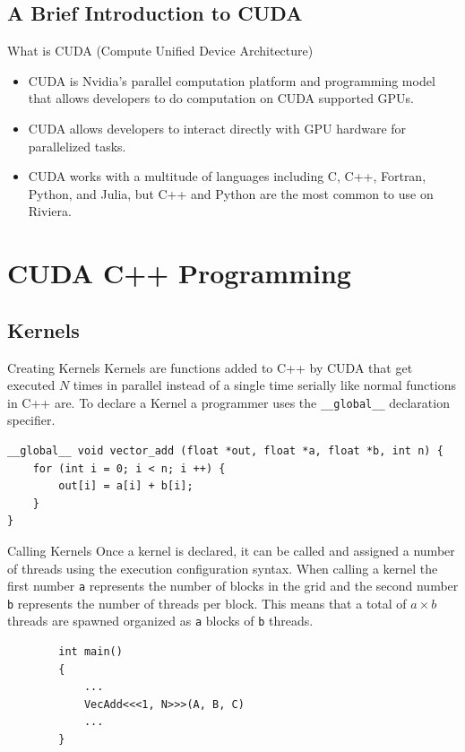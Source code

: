 \documentclass[aspectratio=169]{beamer}
\begin{document}
\subsection{A Brief Introduction to CUDA}

\begin{frame}{What is CUDA (Compute Unified Device Architecture)}
	\begin{itemize}
		\item CUDA is Nvidia's parallel computation platform and programming model that allows developers to do computation on CUDA supported GPUs.
		\item CUDA allows developers to interact directly with GPU hardware for parallelized tasks.
		\item CUDA works with a multitude of languages including C, C++, Fortran, Python, and Julia, but C++ and Python are the most common to use on Riviera.
	\end{itemize}
\end{frame}

\section{CUDA C++ Programming}
\subsection{Kernels}
\begin{frame}[fragile]{Creating Kernels}
	Kernels are functions added to C++ by CUDA that get executed \(N\) times in parallel instead of a single time serially like normal functions in C++ are. To declare a Kernel a programmer uses the \texttt{__global__} declaration specifier.

	\begin{verbatim}
__global__ void vector_add (float *out, float *a, float *b, int n) {
    for (int i = 0; i < n; i ++) {
        out[i] = a[i] + b[i];
    }
}
    \end{verbatim}

\end{frame}

\begin{frame}[fragile]{Calling Kernels}
	Once a kernel is declared, it can be called and assigned a number of threads using the  execution configuration syntax. When calling a kernel the first number \texttt{a} represents the number of blocks in the grid and the second number \texttt{b} represents the number of threads per block. This means that a total of \(a \times b\) threads are spawned organized as \texttt{a} blocks of \texttt{b} threads.

	\begin{verbatim}
		int main()
		{
			...
			VecAdd<<<1, N>>>(A, B, C)
			...
		}
  \end{verbatim}
\end{frame}
\end{document}
